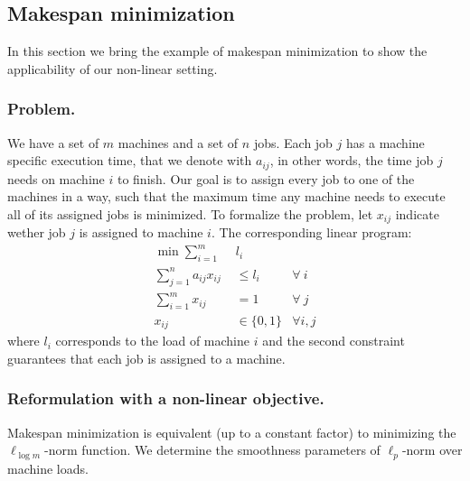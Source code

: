 
\subsection{Makespan minimization} \label{appix-norm}

In this section we bring the example of makespan minimization to show the applicability of our non-linear setting.

\subsubsection*{Problem.}
We have a set of $m$ machines and a set of $n$ jobs. Each job $j$ has a machine specific execution time, that we denote with $a_{ij}$, in other words, the time job $j$ needs on machine $i$ to finish. Our goal is to assign every job to one of the machines in a way, such that the maximum time any machine needs to execute all of its assigned jobs is minimized. To formalize the problem, let $x_{ij}$ indicate wether job $j$ is assigned to machine $i$. The corresponding linear program:
%
\begin{align*}
    \min \sum_{i = 1}^{m}\ \ & l_i \\
    \sum_{j = 1}^{n} a_{ij} x_{ij} &\le l_i & \forall\ i \\
    \sum_{i=1}^{m} x_{ij} & = 1 & \forall\ j \\
    x_{ij} & \in \{0,1\} & \forall i,j
\end{align*}
%
where $l_i$ corresponds to the load of machine $i$ and the second constraint guarantees that each job is assigned to a machine.

\subsubsection*{Reformulation with a non-linear objective.}
Makespan minimization is equivalent (up to a constant factor) to minimizing the $\ell_{\log m}$-norm function.
We determine the smoothness parameters of $\ell_{p}$-norm over machine loads.

